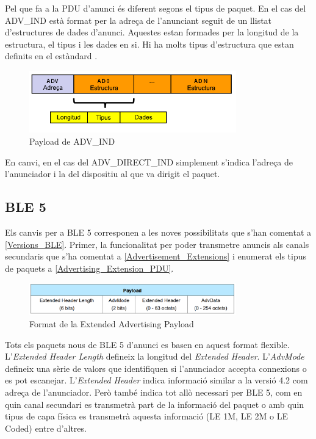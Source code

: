 Pel que fa a la PDU d'anunci és diferent segons el tipus de paquet.
En el cas del ADV\_IND està format per la adreça de l'anunciant seguit de un llistat d'estructures de dades d'anunci.
Aquestes estan formades per la longitud de la estructura, el tipus i les dades en si.
Hi ha molts tipus d'estructura que estan definits en el estàndard \cite{AD_Types}.

\begin{figure}[!h]
	\begin{center}
		\includegraphics[width=0.8\textwidth]{./images/adv-ind-packet.png}
		\caption{Payload de ADV\_IND}
	\end{center}
\end{figure}

En canvi, en el cas del ADV\_DIRECT\_IND simplement s'indica l'adreça de l'anunciador i la del dispositiu al que va dirigit el paquet.

\subsection{BLE 5}
Els canvis per a BLE 5 corresponen a les noves possibilitats que s'han comentat a \ref{Versions_BLE}.
Primer, la funcionalitat per poder transmetre anuncis als canals secundaris que s'ha comentat a \ref{Advertisement_Extensions} i enumerat els tipus de paquets a \ref{Advertising_Extension_PDU}.

\begin{figure}[!h]
	\begin{center}
		\includegraphics[width=0.8\textwidth]{./images/Common_Extended_Advertising_Payload_Format.png}
		\caption{Format de la Extended Advertising Payload \cite{BLE_5_Extended_Advertising}}
	\end{center}
\end{figure}

Tots els paquets nous de BLE 5 d'anunci es basen en aquest format flexible.
L'\textit{Extended Header Length} defineix la longitud del \textit{Extended Header}.
L'\textit{AdvMode} defineix una sèrie de valors que identifiquen si l'anunciador accepta connexions o es pot escanejar.
L'\textit{Extended Header} indica informació similar a la versió 4.2 com adreça de l'anunciador.
Però també indica tot allò necessari per BLE 5, com en quin canal secundari es transmetrà part de la informació del paquet o amb quin tipus de capa física es transmetrà aquesta informació (LE 1M, LE 2M o LE Coded) entre d'altres.
